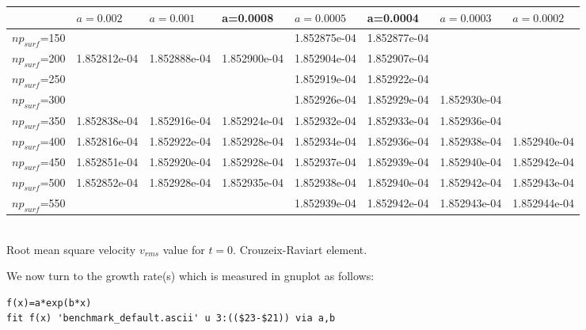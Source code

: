 \begin{center}
\begin{tabular}{|l|l|l|l|l|l|l|l|}
\hline
                & $a=0.002$     & $a=0.001$    & a=0.0008     & $a=0.0005$    & a=0.0004     & $a=0.0003$ & $a=0.0002$ \\ \hline
$np_{surf}$=150 &               &              &              & 1.852875e-04  & 1.852877e-04 & & \\ \hline
$np_{surf}$=200 & 1.852812e-04  & 1.852888e-04 & 1.852900e-04 & 1.852904e-04  & 1.852907e-04 & & \\ \hline
$np_{surf}$=250 &               &              &              & 1.852919e-04  & 1.852922e-04 & & \\ \hline
$np_{surf}$=300 &               &              &              & 1.852926e-04  & 1.852929e-04 & 1.852930e-04 & \\ \hline
$np_{surf}$=350 & 1.852838e-04  & 1.852916e-04 & 1.852924e-04 & 1.852932e-04  & 1.852933e-04 & 1.852936e-04 & \\ \hline
$np_{surf}$=400 & 1.852816e-04  & 1.852922e-04 & 1.852928e-04 & 1.852934e-04  & 1.852936e-04 & 1.852938e-04 & 1.852940e-04 \\ \hline
$np_{surf}$=450 & 1.852851e-04  & 1.852920e-04 & 1.852928e-04 & 1.852937e-04  & 1.852939e-04 & 1.852940e-04 & 1.852942e-04 \\ \hline
$np_{surf}$=500 & 1.852852e-04  & 1.852928e-04 & 1.852935e-04 & 1.852938e-04  & 1.852940e-04 & 1.852942e-04 & 1.852943e-04 \\ \hline
$np_{surf}$=550 &               &              &              & 1.852939e-04  & 1.852942e-04 & 1.852943e-04 & 1.852944e-04 \\ \hline
\end{tabular} \\
{\captionfont
Root mean square velocity $v_{rms}$ value for $t=0$. Crouzeix-Raviart element.}
\end{center}


We now turn to the growth rate(s) which is measured in gnuplot as follows:

\begin{verbatim}
f(x)=a*exp(b*x)
fit f(x) 'benchmark_default.ascii' u 3:(($23-$21)) via a,b
\end{verbatim}

